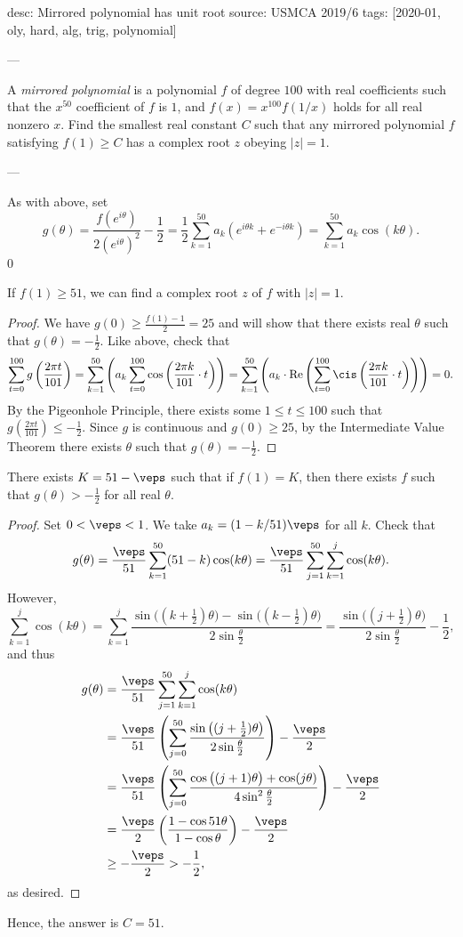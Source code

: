 desc: Mirrored polynomial has unit root
source: USMCA 2019/6
tags: [2020-01, oly, hard, alg, trig, polynomial]

---

A \emph{mirrored polynomial} is a polynomial $f$ of degree $100$ with real coefficients such that the $x^{50}$ coefficient of $f$ is $1$, and $f(x)=x^{100}f(1/x)$ holds for all real nonzero $x$. Find the smallest real constant $C$ such that any mirrored polynomial $f$ satisfying $f(1)\ge C$ has a complex root $z$ obeying $|z|=1$.

---

As with above, set \[g(\theta)=\frac{f(e^{i\theta})}{2(e^{i\theta})^2}-\frac12=\frac12\sum_{k=1}^{50}a_k\left(e^{i\theta k}+e^{-i\theta k}\right)=\sum_{k=1}^{50}a_k\cos(k\theta).\]
\setcounter{claim}0
\begin{claim}
    If $f(1)\ge 51$, we can find a complex root $z$ of $f$ with $|z|=1$.
\end{claim}
\begin{proof}
    We have $g(0)\ge\tfrac{f(1)-1}2=25$ and will show that there exists real $\theta$ such that $g(\theta)=-\tfrac12$. Like above, check that \[\sum_{t=0}^{100}g\left(\frac{2\pi t}{101}\right)=\sum_{k=1}^{50}\left(a_k\sum_{t=0}^{100}\cos\left(\frac{2\pi k}{101}\cdot t\right)\right)=\sum_{k=1}^{50}\left(a_k\cdot\operatorname{Re}\left(\sum_{t=0}^{100}\cis\left(\frac{2\pi k}{101}\cdot t\right)\right)\right)=0.\]
    By the Pigeonhole Principle, there exists some $1\le t\le 100$ such that $g(\tfrac{2\pi t}{101})\le-\frac12$. Since $g$ is continuous and $g(0)\ge 25$, by the Intermediate Value Theorem there exists $\theta$ such that $g(\theta)=-\tfrac12$.
\end{proof}
\begin{claim}
    There exists $K=51-\veps$ such that if $f(1)=K$, then there exists $f$ such that $g(\theta)>-\tfrac12$ for all real $\theta$.
\end{claim}
\begin{proof}
    Set $0<\veps<1$. We take $a_k=(1-k/51)\veps$ for all $k$. Check that \[g(\theta)=\frac{\veps}{51}\sum_{k=1}^{50}(51-k)\cos(k\theta)=\frac{\veps}{51}\sum_{j=1}^{50}\sum_{k=1}^j\cos(k\theta).\]
    However, \[\sum_{k=1}^j\cos(k\theta)=\sum_{k=1}^j\frac{\sin\big((k+\tfrac12)\theta\big)-\sin\big((k-\tfrac12)\theta\big)}{2\sin\tfrac\theta2}=\frac{\sin\big((j+\tfrac12)\theta\big)}{2\sin\tfrac\theta2}-\frac12,\]
    and thus
    \begin{align*}
        g(\theta)&=\frac{\veps}{51}\sum_{j=1}^{50}\sum_{k=1}^j\cos(k\theta)\\
        &=\frac{\veps}{51}\left(\sum_{j=0}^{50}\frac{\sin\big((j+\tfrac12)\theta\big)}{2\sin\tfrac\theta2}\right)-\frac\veps2\\
        &=\frac{\veps}{51}\left(\sum_{j=0}^{50}\frac{\cos\big((j+1)\theta\big)+\cos(j\theta)}{4\sin^2\tfrac\theta2}\right)-\frac\veps2\\
        &=\frac\veps2\left(\frac{1-\cos51\theta}{1-\cos\theta}\right)-\frac\veps2\\
        &\ge-\frac\veps2>-\frac12,
    \end{align*}
    as desired.
\end{proof}

Hence, the answer is $C=51$.
